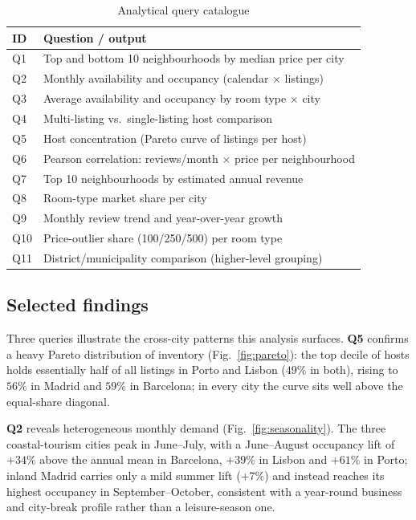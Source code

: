 \documentclass[conference]{IEEEtran}
\begin{document}
\begin{table}[H]
\caption{Analytical query catalogue}
\label{tab:queries}
\centering
\renewcommand{\arraystretch}{1.15}
\begin{tabular}{p{0.4cm}p{6.7cm}}
\toprule
\textbf{ID} & \textbf{Question / output} \\
\midrule
Q1  & Top and bottom 10 neighbourhoods by median price per city \\
Q2  & Monthly availability and occupancy (calendar $\times$ listings) \\
Q3  & Average availability and occupancy by room type $\times$ city \\
Q4  & Multi-listing vs.\ single-listing host comparison \\
Q5  & Host concentration (Pareto curve of listings per host) \\
Q6  & Pearson correlation: reviews/month $\times$ price per neighbourhood \\
Q7  & Top 10 neighbourhoods by estimated annual revenue \\
Q8  & Room-type market share per city \\
Q9  & Monthly review trend and year-over-year growth \\
Q10 & Price-outlier share (\texteuro{}100/\texteuro{}250/\texteuro{}500) per room type \\
Q11 & District/municipality comparison (higher-level grouping) \\
\bottomrule
\end{tabular}
\end{table}

\subsection{Selected findings}
Three queries illustrate the cross-city patterns this analysis surfaces. \textbf{Q5} confirms a heavy Pareto distribution of inventory (Fig.~\ref{fig:pareto}): the top decile of hosts holds essentially half of all listings in Porto and Lisbon ($49\%$ in both), rising to $56\%$ in Madrid and $59\%$ in Barcelona; in every city the curve sits well above the equal-share diagonal.

\textbf{Q2} reveals heterogeneous monthly demand (Fig.~\ref{fig:seasonality}). The three coastal-tourism cities peak in June--July, with a June--August occupancy lift of $+34\%$ above the annual mean in Barcelona, $+39\%$ in Lisbon and $+61\%$ in Porto; inland Madrid carries only a mild summer lift ($+7\%$) and instead reaches its highest occupancy in September--October, consistent with a year-round business and city-break profile rather than a leisure-season one.
\end{document}
